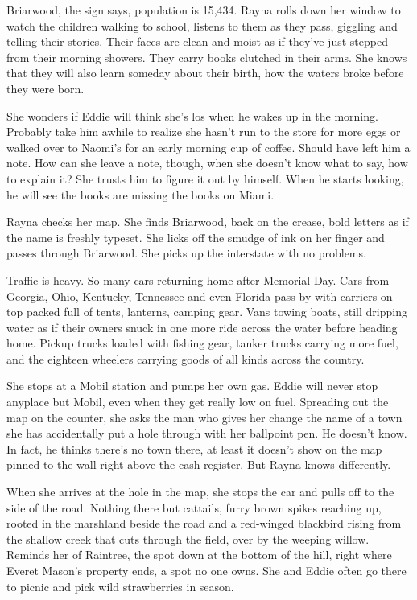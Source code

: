 \documentclass[
]{article}
\begin{document}
Briarwood, the sign says, population is 15,434. Rayna rolls down her
window to watch the chil­dren walking to school, listens to them as they
pass, giggling and telling their stories. Their faces are clean and
moist as if they've just stepped from their morning showers. They carry
books clutched in their arms. She knows that they will also learn
someday about their birth, how the waters broke before they were born.

She wonders if Eddie will think she's los when he wakes up in the
morning. Probably take him awhile to realize she hasn't run to the store
for more eggs or walked over to Naomi's for an early morning cup of
coffee. Should have left him a note. How can she leave a note, though,
when she doesn't know what to say, how to explain it? She trusts him to
figure it out by himself. When he starts looking, he will see the books
are missing the books on Miami.

Rayna checks her map. She finds Briarwood, back on the crease, bold
letters as if the name is freshly typeset. She licks off the smudge of
ink on her finger and passes through Briarwood. She picks up the
interstate with no problems.

Traffic is heavy. So many cars returning home after Memorial Day. Cars
from Georgia, Ohio, Kentucky, Tennessee and even Florida pass by with
carriers on top packed full of tents, lanterns, camping gear. Vans
towing boats, still dripping water as if their owners snuck in one more
ride across the water before heading home. Pickup trucks loaded with
fishing gear, tanker trucks carrying more fuel, and the eighteen
wheelers carrying goods of all kinds across the country.

She stops at a Mobil station and pumps her own gas. Eddie will never
stop anyplace but Mobil, even when they get really low on fuel.
Spreading out the map on the counter, she asks the man who gives her
change the name of a town she has accidentally put a hole through with
her ballpoint pen. He doesn't know. In fact, he thinks there's no town
there, at least it doesn't show on the map pinned to the wall right
above the cash register. But Rayna knows differently.

When she arrives at the hole in the map, she stops the car and pulls off
to the side of the road. Nothing there but cattails, furry brown spikes
reaching up, rooted in the marshland beside the road and a red-winged
blackbird rising from the shallow creek that cuts through the field,
over by the weep­ing willow. Reminds her of Raintree, the spot down at
the bottom of the hill, right where Everet Mason's property ends, a spot
no one owns. She and Eddie often go there to picnic and pick wild
strawberries in season.
\end{document}
